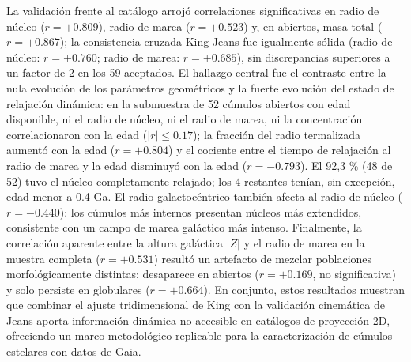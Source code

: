     La validación frente al catálogo arrojó correlaciones significativas en 
    radio de núcleo ($r = +0.809$), radio de marea ($r = +0.523$) y, 
    en abiertos, masa total ($r = +0.867$); la consistencia cruzada King-Jeans 
    fue igualmente sólida (radio de núcleo: $r = +0.760$; radio de marea: 
    $r = +0.685$), sin discrepancias superiores a un factor de 2 en los 59 
    aceptados. El hallazgo central fue el contraste entre la nula evolución de 
    los parámetros geométricos y la fuerte evolución del estado de relajación 
    dinámica: en la submuestra de 52 cúmulos abiertos con edad disponible, ni el 
    radio de núcleo, ni el radio de marea, ni la concentración correlacionaron 
    con la edad ($|r| \leq 0.17$); la fracción del radio termalizada aumentó con 
    la edad ($r = +0.804$) y el cociente entre el tiempo de relajación al radio 
    de marea y la edad disminuyó con la edad ($r = -0.793$). El 92,3 \% (48 de 
    52) tuvo el núcleo completamente relajado; los 4 restantes tenían, sin 
    excepción, edad menor a 0.4 Ga. El radio galactocéntrico también afecta al 
    radio de núcleo ($r = -0.440$): los cúmulos más internos presentan núcleos 
    más extendidos, consistente con un campo de marea galáctico más intenso. 
    Finalmente, la correlación aparente entre la altura galáctica $|Z|$ y el 
    radio de marea en la muestra completa ($r = +0.531$) resultó un artefacto de 
    mezclar poblaciones morfológicamente distintas: desaparece en abiertos 
    ($r = +0.169$, no significativa) y solo persiste en globulares 
    ($r = +0.664$). En conjunto, estos resultados muestran que combinar el 
    ajuste tridimensional de King con la validación cinemática de Jeans aporta 
    información dinámica no accesible en catálogos de proyección 2D, ofreciendo 
    un marco metodológico replicable para la caracterización de cúmulos 
    estelares con datos de Gaia.